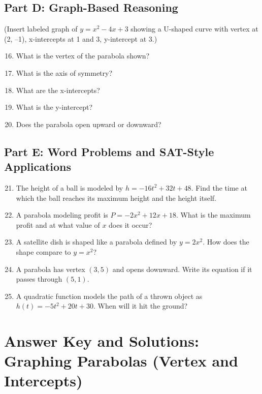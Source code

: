 \documentclass[12pt]{article}
\begin{document}
\subsection*{Part D: Graph-Based Reasoning}
(Insert labeled graph of \(y = x^2 - 4x + 3\) showing a U-shaped curve with vertex at (2, –1), x-intercepts at 1 and 3, y-intercept at 3.)
\begin{enumerate}
  \setcounter{enumi}{15}
  \item What is the vertex of the parabola shown?
  \item What is the axis of symmetry?
  \item What are the x-intercepts?
  \item What is the y-intercept?
  \item Does the parabola open upward or downward?
\end{enumerate}

\subsection*{Part E: Word Problems and SAT-Style Applications}
\begin{enumerate}
  \setcounter{enumi}{20}
  \item The height of a ball is modeled by \(h = -16t^2 + 32t + 48.\) Find the time at which the ball reaches its maximum height and the height itself.
  \item A parabola modeling profit is \(P = -2x^2 + 12x + 18.\) What is the maximum profit and at what value of \(x\) does it occur?
  \item A satellite dish is shaped like a parabola defined by \(y = 2x^2.\) How does the shape compare to \(y = x^2\)?
  \item A parabola has vertex \((3, 5)\) and opens downward. Write its equation if it passes through \((5, 1).\)
  \item A quadratic function models the path of a thrown object as \(h(t) = -5t^2 + 20t + 30.\) When will it hit the ground?
\end{enumerate}

\newpage


\section*{Answer Key and Solutions: Graphing Parabolas (Vertex and Intercepts)}
\end{document}
